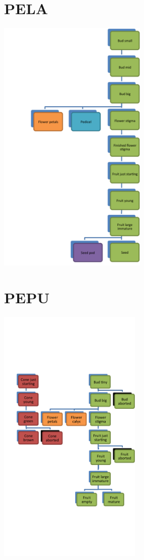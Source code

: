 \documentclass[10pt]{book} %
\begin{document}
\section{PELA}
\begin{multicols}{2}
\includegraphics[width=2.8in]{PELA.png}
\vfill
\columnbreak

\end{multicols}



\clearpage
\newpage
\section{PEPU}
\begin{multicols}{2}
\includegraphics[width=2.7in]{PEPU.png}
\vfill
\columnbreak

\end{multicols}
\clearpage
\newpage
\end{document}
